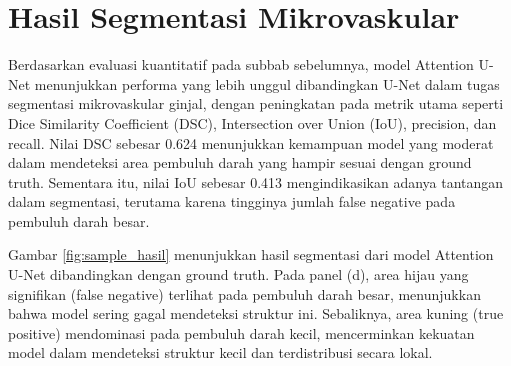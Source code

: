 \section{Hasil Segmentasi Mikrovaskular}

\noindent Berdasarkan evaluasi kuantitatif pada subbab sebelumnya, model Attention U-Net menunjukkan performa yang lebih unggul dibandingkan U-Net dalam tugas segmentasi mikrovaskular ginjal, dengan peningkatan pada metrik utama seperti Dice Similarity Coefficient (DSC), Intersection over Union (IoU), precision, dan recall. Nilai DSC sebesar 0.624 menunjukkan kemampuan model yang moderat dalam mendeteksi area pembuluh darah yang hampir sesuai dengan ground truth. Sementara itu, nilai IoU sebesar 0.413 mengindikasikan adanya tantangan dalam segmentasi, terutama karena tingginya jumlah false negative pada pembuluh darah besar.


\noindent Gambar \ref{fig:sample_hasil} menunjukkan hasil segmentasi dari model Attention U-Net dibandingkan dengan ground truth. Pada panel (d), area hijau yang signifikan (false negative) terlihat pada pembuluh darah besar, menunjukkan bahwa model sering gagal mendeteksi struktur ini. Sebaliknya, area kuning (true positive) mendominasi pada pembuluh darah kecil, mencerminkan kekuatan model dalam mendeteksi struktur kecil dan terdistribusi secara lokal.


